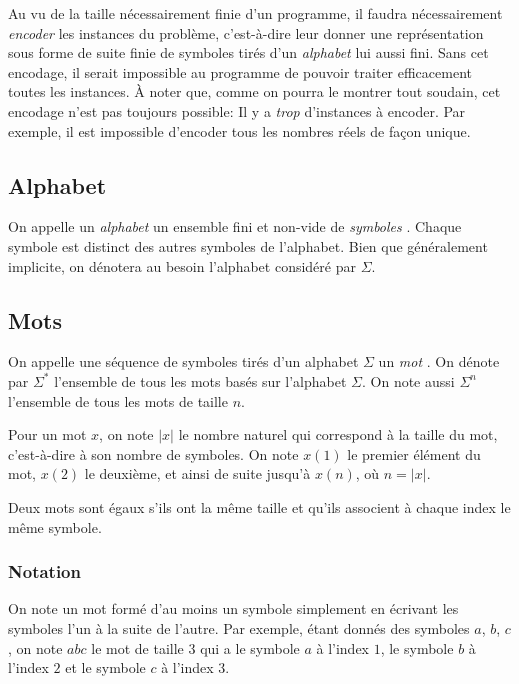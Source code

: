 Au vu de la taille nécessairement finie d'un programme, il faudra nécessairement \textit{encoder} les instances du problème, c'est-à-dire leur donner une représentation sous forme de suite finie de symboles tirés d'un \og \textit{alphabet} \fg{} lui aussi fini.
Sans cet encodage, il serait impossible au programme de pouvoir traiter efficacement toutes les instances.
À noter que, comme on pourra le montrer tout soudain, cet encodage n'est pas toujours possible:
Il y a \textit{trop} d'instances à encoder.
Par exemple, il est impossible d'encoder tous les nombres réels de façon unique.

\subsection{Alphabet}

On appelle un \og \textit{alphabet} \fg{} un ensemble fini et non-vide de \og \textit{symboles} \fg{}.
Chaque symbole est distinct des autres symboles de l'alphabet.
Bien que généralement implicite, on dénotera au besoin l'alphabet considéré par $\Sigma$.

\subsection{Mots}

On appelle une séquence de symboles tirés d'un alphabet $\Sigma$ un \og \textit{mot} \fg{}.
On dénote par $\Sigma^*$ l'ensemble de tous les mots basés sur l'alphabet $\Sigma$.
On note aussi $\Sigma^n$ l'ensemble de tous les mots de taille $n$.

Pour un mot $x$, on note $|x|$ le nombre naturel qui correspond à la taille du mot, c'est-à-dire à son nombre de symboles.
On note $x(1)$ le premier élément du mot, $x(2)$ le deuxième, et ainsi de suite jusqu'à $x(n)$, où $n = |x|$.

Deux mots sont égaux s'ils ont la même taille et qu'ils associent à chaque index le même symbole.

\subsubsection{Notation}

On note un mot formé d'au moins un symbole simplement en écrivant les symboles l'un à la suite de l'autre.
Par exemple, étant donnés des symboles $a$, $b$, $c$, on note $abc$ le mot de taille $3$ qui a le symbole $a$ à l'index $1$, le symbole $b$ à l'index $2$ et le symbole $c$ à l'index $3$.

